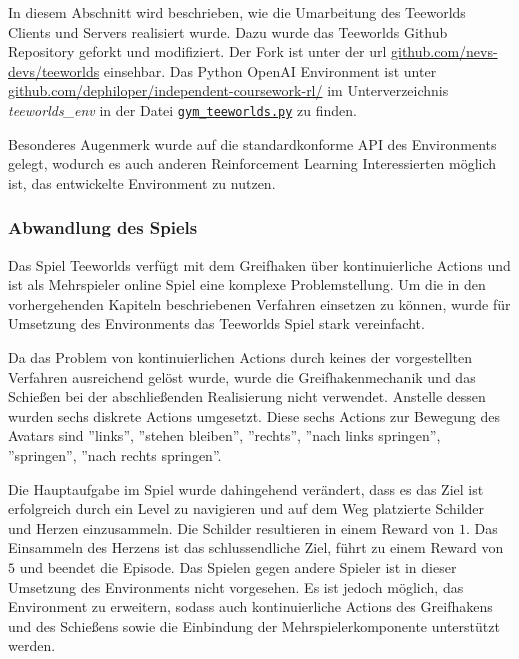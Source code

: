 \documentclass[11pt]{scrartcl}
\begin{document}
In diesem Abschnitt wird beschrieben, wie die Umarbeitung des Teeworlds Clients und
Servers realisiert wurde. Dazu wurde das Teeworlds Github Repository geforkt und
modifiziert. Der Fork ist unter der url \url{github.com/nevs-devs/teeworlds} einsehbar.
Das Python OpenAI Environment ist unter \url{github.com/dephiloper/independent-coursework-rl/}
im Unterverzeichnis \textit{teeworlds\_env} in der Datei
\href{github.com/dephiloper/independent-coursework-rl/teeworlds_env/gym_teeworlds.py}
{\nolinkurl{gym\_teeworlds.py}} zu finden.

Besonderes Augenmerk wurde auf die standardkonforme API des Environments gelegt, wodurch
es auch anderen Reinforcement Learning Interessierten möglich ist, das entwickelte
Environment zu nutzen.

\subsubsection{Abwandlung des Spiels}
Das Spiel Teeworlds verfügt mit dem Greifhaken über kontinuierliche Actions und ist als
Mehrspieler online Spiel eine komplexe Problemstellung. Um die in den vorhergehenden
Kapiteln beschriebenen Verfahren einsetzen zu können, wurde für Umsetzung des Environments
das Teeworlds Spiel stark vereinfacht.

Da das Problem von kontinuierlichen Actions durch keines der vorgestellten Verfahren
ausreichend gelöst wurde, wurde die Greifhakenmechanik und das Schießen bei der
abschließenden Realisierung nicht verwendet. Anstelle dessen wurden sechs diskrete
Actions umgesetzt. Diese sechs Actions zur Bewegung des Avatars sind ''links'',
''stehen bleiben'', ''rechts'', ''nach links springen'', ''springen'',
''nach rechts springen''.

Die Hauptaufgabe im Spiel wurde dahingehend verändert, dass es das Ziel ist erfolgreich
durch ein Level zu navigieren und auf dem Weg platzierte Schilder und Herzen einzusammeln.
Die Schilder resultieren in einem Reward von $1$. Das Einsammeln des Herzens ist das
schlussendliche Ziel, führt zu einem Reward von $5$ und beendet die Episode. Das Spielen
gegen andere Spieler ist in dieser Umsetzung des Environments nicht vorgesehen. 
Es ist jedoch möglich, das Environment zu erweitern, sodass auch kontinuierliche Actions
des Greifhakens und des Schießens sowie die Einbindung der Mehrspielerkomponente
unterstützt werden.
\end{document}
